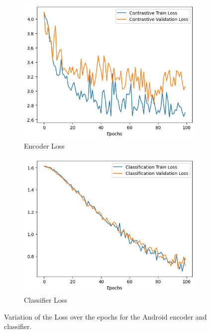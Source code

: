\begin{figure}[H]
    \centering
    \begin{subfigure}{0.45\textwidth}
        \includegraphics[width=\linewidth]{Images/ConLoss_5.png}
        \caption{Encoder Loss}
        \label{fig:ConLoss}
    \end{subfigure}
    \hfill
    \begin{subfigure}{0.45\textwidth}
        \includegraphics[width=\linewidth]{Images/ClassLoss_5.png}
        \caption{Classifier Loss}
        \label{fig:ClassLoss}
    \end{subfigure}
    \caption{Variation of the Loss over the epochs for the Android encoder and classifier.}
    \label{fig:Loss}
\end{figure}

